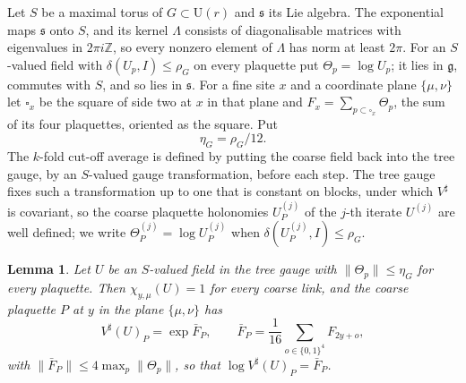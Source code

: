 \documentclass[11pt]{amsart}
\newtheorem{lemma}[theorem]{Lemma}
\theoremstyle{definition}
\theoremstyle{remark}
\numberwithin{equation}{section}
\newcommand{\Z}{\mathbb{Z}}
\newcommand{\U}{\mathrm{U}}
\begin{document}
Let $S$ be a maximal torus of $G\subset\U(r)$ and $\mathfrak s$ its Lie
algebra. The exponential maps $\mathfrak s$ onto $S$, and its kernel
$\Lambda$ consists of diagonalisable matrices with eigenvalues in $2\pi i\Z$,
so every nonzero element of $\Lambda$ has norm at least $2\pi$. For an
$S$-valued field with $\delta(U_p,I)\le\rho_G$ on every plaquette put
$\Theta_p=\log U_p$; it lies in $\mathfrak g$, commutes with $S$, and so
lies in $\mathfrak s$. For a fine site $x$ and a coordinate plane $\{\mu,\nu
\}$ let $\square_x$ be the square of side two at $x$ in that plane and
$F_x=\sum_{p\subset\square_x}\Theta_p$, the sum of its four plaquettes,
oriented as the square. Put
\[
\eta_G=\rho_G/12.
\]
The $k$-fold cut-off average is defined by putting the coarse field back
into the tree gauge, by an $S$-valued gauge transformation, before each
step. The tree gauge fixes such a transformation up to one that is constant
on blocks, under which $V^\sharp$ is covariant, so the coarse plaquette
holonomies $U^{(j)}_P$ of the $j$-th iterate $U^{(j)}$ are well defined; we
write $\Theta^{(j)}_P=\log U^{(j)}_P$ when $\delta(U^{(j)}_P,I)\le\rho_G$.

\begin{lemma}\label{lem:torusstep}
Let $U$ be an $S$-valued field in the tree gauge with $\lVert\Theta_p\rVert
\le\eta_G$ for every plaquette. Then $\chi_{y,\mu}(U)=1$ for every coarse
link, and the coarse plaquette $P$ at $y$ in the plane $\{\mu,\nu\}$ has
\[
V^\sharp(U)_P=\exp\bar F_P,\qquad\bar F_P=\frac1{16}\sum_{o\in\{0,1\}^4}
F_{2y+o},
\]
with $\lVert\bar F_P\rVert\le4\max_p\lVert\Theta_p\rVert$, so that $\log
V^\sharp(U)_P=\bar F_P$.
\end{lemma}
\end{document}
